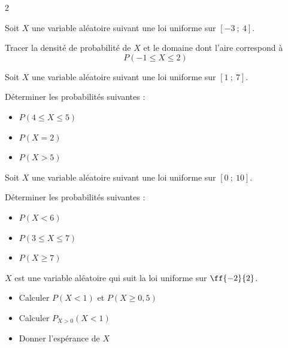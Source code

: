 \def\level{BTS}  %
\def\course{CIEL 2}
\def\chaptername{Lois continues} %
\def\docpart{Loi uniforme~--~Exercices} %
\def\docname{C2251}        %

\pagestyle{cours_FP}
\makeheaderBTS{} %

\begin{multicols}{2}

	\begin{exercice_cours}[\quad]{}
Soit $X$ une variable aléatoire suivant une loi uniforme sur $[-3~;~4]$.

Tracer la densité de probabilité de $X$ et le domaine dont l'aire correspond à \[P(-1\leq X\leq 2)\]
	\end{exercice_cours}
	\begin{exercice_cours}[\quad]{}

Soit $X$ une variable aléatoire suivant une loi uniforme sur $[1~;~7]$.

Déterminer les probabilités suivantes :

\begin{itemize}
	\item $P(4\leq X\leq 5)$
	\item $P(X=2)$
	\item $P(X> 5)$
\end{itemize}

		\end{exercice_cours}
\begin{exercice_cours}[\quad]{}

Soit $X$ une variable aléatoire suivant une loi uniforme sur $[0~;~10]$.

Déterminer les probabilités suivantes :

\begin{itemize}
	\item $P(X<6)$
	\item $P(3\leq X\leq 7)$
	\item $P(X\geq 7)$
\end{itemize}

		\end{exercice_cours}

		\begin{exercice_cours}[\quad]{}

		$X$ est une variable aléatoire qui suit la loi uniforme sur $\ff{-2}{2}$.

		\begin{itemize}
			\item Calculer $P(X<1)$ et $P(X\geq 0,5)$
			\item Calculer $P_{X>0}(X<1)$
			\item Donner l'espérance de $X$
		\end{itemize}
	\end{exercice_cours}


\end{multicols}
